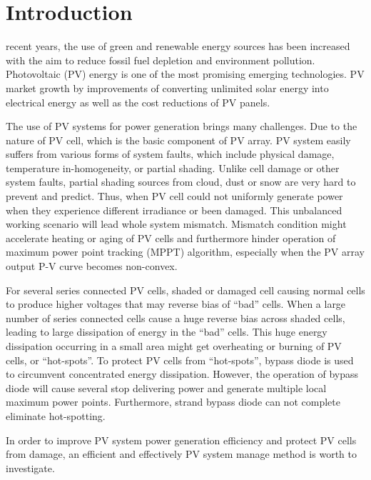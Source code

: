 \documentclass[journal]{IEEEtran}
\begin{document}
\IEEEpeerreviewmaketitle



\section{Introduction}
 recent years, the use of green and renewable energy sources has been increased with the aim to reduce fossil fuel depletion and environment pollution.
Photovoltaic (PV) energy is one of the most promising emerging technologies.
PV market growth by improvements of converting unlimited solar energy into electrical energy as well as the cost reductions of PV panels.

The use of PV systems for power generation brings many challenges.
Due to the nature of PV cell, which is the basic component of PV array.
PV system easily suffers from various forms of system faults, which include physical damage, temperature in-homogeneity, or partial shading.
Unlike cell damage or other system faults, partial shading sources from cloud, dust or snow are very hard to prevent and predict.
Thus, when PV cell could not uniformly generate power when they experience different irradiance or been damaged.
This unbalanced working scenario will lead whole system mismatch.
Mismatch condition might accelerate heating or aging of PV cells and furthermore hinder operation of maximum power point tracking (MPPT) algorithm, especially when the PV array output P-V curve becomes non-convex\cite{islam2018performance}.

For several series connected PV cells, shaded or damaged cell causing normal cells to produce higher voltages that may reverse bias of ``bad'' cells.
When a large number of series connected cells cause a huge reverse bias across shaded cells, leading to large dissipation of energy in the ``bad'' cells.
This huge energy dissipation occurring in a small area might get overheating or burning of PV cells, or ``hot-spots''.
To protect PV cells from ``hot-spots'', bypass diode is used to circumvent concentrated energy dissipation.
However, the operation of bypass diode will cause several stop delivering power and generate multiple local maximum power points\cite{Orozco-Gutierrez2016}.
Furthermore, strand bypass diode can not complete eliminate hot-spotting\cite{kim2015reexamination}.

In order to improve PV system power generation efficiency and protect PV cells from damage, an efficient and effectively PV system manage method is worth to investigate.
\end{document}
